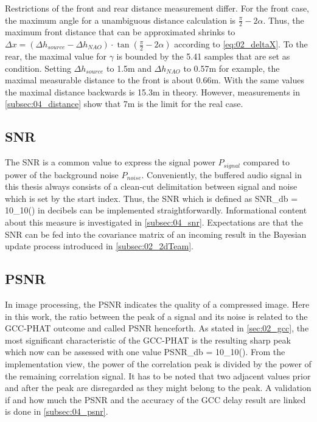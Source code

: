 Restrictions of the front and rear distance measurement differ.
For the front case, the maximum angle for a unambiguous distance calculation
is $\frac{\pi}{2}- 2\alpha$.
Thus, the maximum front distance that can be approximated shrinks to
$\Delta x = (\Delta h_{source} - \Delta h_{NAO}) \cdot \tan(\frac{\pi}{2} - 2\alpha)$
according to \cref{eq:02_deltaX}.
To the rear, the maximal value for $\gamma$ is bounded by the 5.41 samples that
are set as condition.
Setting $\Delta h_{source}$ to 1.5\si{m} and $\Delta h_{NAO}$ to 0.57\si{\meter} for example,
the maximal measurable distance to the front is about 0.66\si{\meter}.
With the same values the maximal distance backwards is 15.3\si{\meter} in theory.
However, measurements in \cref{subsec:04_distance} show that 7\si{\meter} is the
limit for the real case. 


\subsection{SNR}
\label{subsec:03_snr}

The \acf{SNR} is a common value to express the signal power $P_{signal}$ compared
to power of the background noise $P_{noise}$.
Conveniently, the buffered audio signal in this thesis always consists of
a clean-cut delimitation between signal and noise which is set by the
start index.
Thus, the \ac{SNR} which is defined as
\bal
    SNR_{db} = 10\log_{10}\left(\right)
    \label{eq:03_snr}
\eal
in decibels can be implemented straightforwardly.
Informational content about this measure is investigated in \cref{subsec:04_snr}.
Expectations are that the \ac{SNR} can be fed into the covariance matrix
of an incoming result in the Bayesian update process introduced in \cref{subsec:02_2dTeam}.

\subsection{PSNR}
\label{subsec:03_psnr}
In image processing, the \acf{PSNR} indicates the quality of a compressed
image. Here in this work, the ratio between the peak of a signal
and its noise is related to the \ac{GCC-PHAT} outcome and called \ac{PSNR}
henceforth.
As stated in \cref{sec:02_gcc}, the most significant characteristic
of the \ac{GCC-PHAT} is the resulting sharp peak which now can be
assessed with one value
\bal
    PSNR_{db} = 10\log_{10}\left(\right).
    \label{eq:03_psnr}
\eal
From the implementation view, the power of the correlation peak is divided by
the power of the remaining correlation signal.
It has to be noted that two adjacent values prior and after the peak
are disregarded as they might belong to the peak.
A validation if and how much the \ac{PSNR} and the accuracy of the \ac{GCC}
delay result are linked is done in \cref{subsec:04_psnr}.